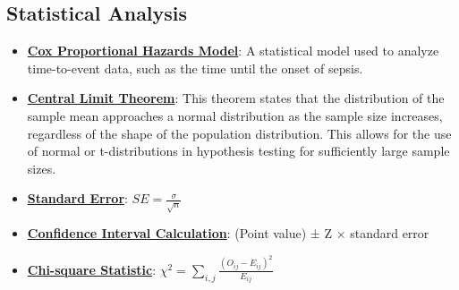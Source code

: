 \documentclass{article}%
\begin{document}
\subsection{Statistical Analysis}%
\label{subsec:StatisticalAnalysis}%
\begin{itemize}[leftmargin=*]%
\item \href{https://purdue.brightspace.com/d2l/common/assets/pdfjs-d2l-dist/1.0.14-legacy/web/viewer.html?file=\%2Fcontent\%2Fenforced\%2F1095465-WL.202510.CS24200.LE1\%2F02L1-datas-intro.pdf\%3Fou\%3D1095465\&lang=en-us\&container=d2l-fileviewer-rendered-pdf\&fullscreen=d2l-fileviewer-rendered-pdf-dialog\&height=667#page=19}{\textbf{Cox Proportional Hazards Model}}: A statistical model used to analyze time-to-event data, such as the time until the onset of sepsis.%
\item \href{https://purdue.brightspace.com/d2l/common/assets/pdfjs-d2l-dist/1.0.14-legacy/web/viewer.html?file=\%2Fcontent\%2Fenforced\%2F1095465-WL.202510.CS24200.LE1\%2F13L2-hypothesis.pdf\%3Fou\%3D1095465\&lang=en-us\&container=d2l-fileviewer-rendered-pdf\&fullscreen=d2l-fileviewer-rendered-pdf-dialog\&height=667#page=18}{\textbf{Central Limit Theorem}}: This theorem states that the distribution of the sample mean approaches a normal distribution as the sample size increases, regardless of the shape of the population distribution. This allows for the use of normal or t-distributions in hypothesis testing for sufficiently large sample sizes.%
\item \href{https://purdue.brightspace.com/d2l/common/assets/pdfjs-d2l-dist/1.0.14-legacy/web/viewer.html?file=\%2Fcontent\%2Fenforced\%2F1095465-WL.202510.CS24200.LE1\%2F15L2-AB-testing.pdf\%3Fou\%3D1095465\&lang=en-us\&container=d2l-fileviewer-rendered-pdf\&fullscreen=d2l-fileviewer-rendered-pdf-dialog\&height=667#page=5}{\textbf{Standard Error}}: $SE = \frac{\sigma}{\sqrt{n}}$%
\item \href{https://purdue.brightspace.com/d2l/common/assets/pdfjs-d2l-dist/1.0.14-legacy/web/viewer.html?file=\%2Fcontent\%2Fenforced\%2F1095465-WL.202510.CS24200.LE1\%2F15L2-AB-testing.pdf\%3Fou\%3D1095465\&lang=en-us\&container=d2l-fileviewer-rendered-pdf\&fullscreen=d2l-fileviewer-rendered-pdf-dialog\&height=667#page=6}{\textbf{Confidence Interval Calculation}}: (Point value) ± Z × standard error%
\item \href{https://purdue.brightspace.com/d2l/common/assets/pdfjs-d2l-dist/1.0.14-legacy/web/viewer.html?file=\%2Fcontent\%2Fenforced\%2F1095465-WL.202510.CS24200.LE1\%2F15L2-AB-testing.pdf\%3Fou\%3D1095465\&lang=en-us\&container=d2l-fileviewer-rendered-pdf\&fullscreen=d2l-fileviewer-rendered-pdf-dialog\&height=667#page=22}{\textbf{Chi-square Statistic}}: $\chi^2 = \sum_{i,j} \frac{(O_{ij} - E_{ij})^2}{E_{ij}}$%

\end{itemize}
\end{document}
